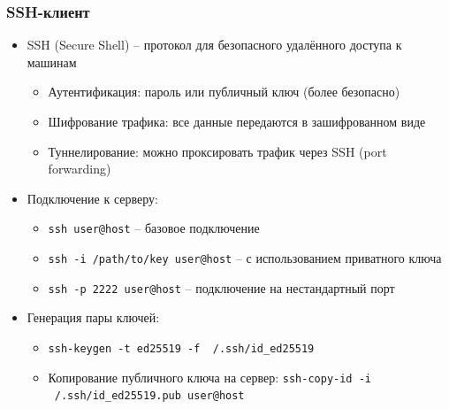\documentclass{beamer}
\begin{document}
\begin{frame}
\frametitle{SSH-клиент}

\begin{itemize}
  \item SSH (Secure Shell) – протокол для безопасного удалённого доступа к машинам
  \begin{itemize}
    \item Аутентификация: пароль или публичный ключ (более безопасно)
    \item Шифрование трафика: все данные передаются в зашифрованном виде
    \item Туннелирование: можно проксировать трафик через SSH (port forwarding)
  \end{itemize}
  \item Подключение к серверу:
  \begin{itemize}
    \item \texttt{ssh user@host} – базовое подключение
    \item \texttt{ssh -i /path/to/key user@host} – с использованием приватного ключа
    \item \texttt{ssh -p 2222 user@host} – подключение на нестандартный порт
  \end{itemize}
  \item Генерация пары ключей:
  \begin{itemize}
    \item \texttt{ssh-keygen -t ed25519 -f ~/.ssh/id\_ed25519}
    \item Копирование публичного ключа на сервер: \texttt{ssh-copy-id -i ~/.ssh/id\_ed25519.pub user@host}
  \end{itemize}
\end{itemize}

\end{frame}
\end{document}
